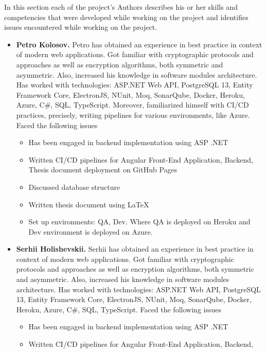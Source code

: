 In this section each of the project's Authors describes his or her skills and competencies that
were developed while working on the project and identifies issues encountered while working on the project.

\begin{itemize}
    \item \textbf{Petro Kolosov.} Petro has obtained an experience in best practice
    in context of modern web applications.
    Got familiar with cryptographic protocols and approaches as well as encryption algorithms,
    both symmetric and asymmetric.
    Also, increased his knowledge in software modules architecture.
    Has worked with technologies: ASP.NET Web API, PostgreSQL 13, Entity Framework Core, ElectronJS,
    NUnit, Moq, SonarQube, Docker, Heroku, Azure, C\#, SQL, TypeScript.
    Moreover, familiarized himself with CI/CD practices, precisely, writing pipelines for various environments,
    like Azure.
    Faced the following issues
    \begin{itemize}
        \item Has been engaged in backend implementation using ASP .NET
        \item Written CI/CD pipelines for Angular Front-End Application, Backend,
        Thesis document deployment on GitHub Pages
        \item Discussed database structure
        \item Written thesis document using \LaTeX
        \item Set up environments: QA, Dev.
        Where QA is deployed on Heroku and Dev environment is deployed on Azure.
    \end{itemize}
    \item \textbf{Serhii Holishevskii.} Serhii has obtained an experience in best practice
    in context of modern web applications.
    Got familiar with cryptographic protocols and approaches as well as encryption algorithms,
    both symmetric and asymmetric.
    Also, increased his knowledge in software modules architecture.
    Has worked with technologies: ASP.NET Web API, PostgreSQL 13, Entity Framework Core, ElectronJS,
    NUnit, Moq, SonarQube, Docker, Heroku, Azure, C\#, SQL, TypeScript.
    Faced the following issues
    \begin{itemize}
        \item Has been engaged in backend implementation using ASP .NET
        \item Written CI/CD pipelines for Angular Front-End Application, Backend,

\end{itemize}
\end{itemize}
